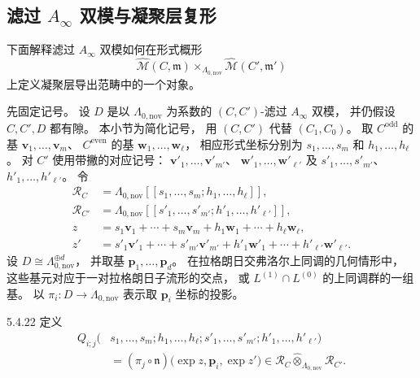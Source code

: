 
\newpage
\subsection{滤过 $A_\infty$ 双模与凝聚层复形}
\label{subsec:5-4-3}

下面解释滤过 $A_\infty$ 双模如何在形式概形
\[
\widehat{\mathcal M}(C,\mathfrak m)
\times_{\Lambda_{0,\mathrm{nov}}}
\widehat{\mathcal M}(C',\mathfrak m')
\]
上定义凝聚层导出范畴中的一个对象。

先固定记号。
设 $D$ 是以 $\Lambda_{0,\mathrm{nov}}$
为系数的 $(C,C')$-滤过
$A_\infty$ 双模，
并仍假设 $C,C',D$ 都有隙。
本小节为简化记号，
用 $(C,C')$ 代替 $(C_1,C_0)$。
取 $C^{\mathrm{odd}}$ 的基
$\mathbf v_1,\ldots,\mathbf v_m$、
$C^{\mathrm{even}}$ 的基
$\mathbf w_1,\ldots,\mathbf w_\ell$，
相应形式坐标分别为
$s_1,\ldots,s_m$
和 $h_1,\ldots,h_\ell$。
对 $C'$ 使用带撇的对应记号：
$\mathbf v'_1,\ldots,\mathbf v'_{m'}$、
$\mathbf w'_1,\ldots,\mathbf w'_{\ell'}$
及 $s'_1,\ldots,s'_{m'}$、
$h'_1,\ldots,h'_{\ell'}$。
令
\[
\begin{aligned}
\mathcal R_C
&=\Lambda_{0,\mathrm{nov}}
[[s_1,\ldots,s_m;h_1,\ldots,h_\ell]],\\
\mathcal R_{C'}
&=\Lambda_{0,\mathrm{nov}}
[[s'_1,\ldots,s'_{m'};h'_1,\ldots,h'_{\ell'}]],\\
z
&=s_1\mathbf v_1+\cdots+s_m\mathbf v_m
+h_1\mathbf w_1+\cdots+h_\ell\mathbf w_\ell,\\
z'
&=s'_1\mathbf v'_1+\cdots+s'_{m'}\mathbf v'_{m'}
+h'_1\mathbf w'_1+\cdots+h'_{\ell'}\mathbf w'_{\ell'}.
\end{aligned}
\]
设 $D\cong\Lambda_{0,\mathrm{nov}}^{\oplus d}$，
并取基 $\mathbf p_1,\ldots,\mathbf p_d$。
在拉格朗日交弗洛尔上同调的几何情形中，
这些基元对应于一对拉格朗日子流形的交点，
或 $L^{(1)}\cap L^{(0)}$
的上同调群的一组基。
以 $\pi_i\colon D\to\Lambda_{0,\mathrm{nov}}$
表示取 $\mathbf p_i$ 坐标的投影。

\begin{definition}{5.4.22}\label{def:5-4-22}
定义
\begin{equation}
\begin{aligned}
Q_{i;j}
(&s_1,\ldots,s_m;h_1,\ldots,h_\ell;
s'_1,\ldots,s'_{m'};h'_1,\ldots,h'_{\ell'})
\\
&=(\pi_j\circ\mathfrak n)
\bigl(\exp z,\mathbf p_i,\exp z'\bigr)
\in\mathcal R_C
\widehat\otimes_{\Lambda_{0,\mathrm{nov}}}
\mathcal R_{C'}.
\end{aligned}
\tag{5.4.23}\label{eq:5-4-23}
\end{equation}
\end{definition}

